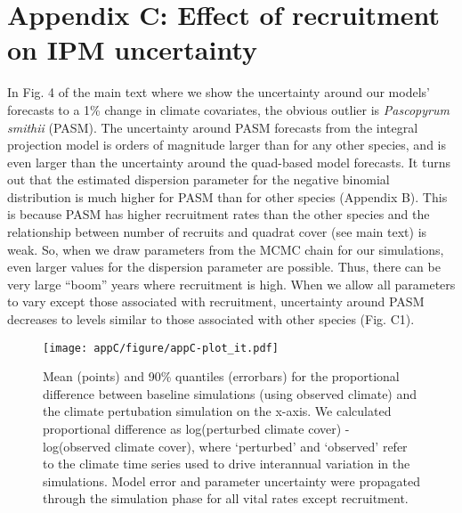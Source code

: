 \documentclass[12pt,]{article}
\author{}
\date{}
\begin{document}
\normalsize


\renewcommand\thefigure{C\arabic{figure}} 



\section{Appendix C: Effect of recruitment on IPM
uncertainty}\label{appendix-c-effect-of-recruitment-on-ipm-uncertainty}

In Fig. 4 of the main text where we show the uncertainty around our
models' forecasts to a 1\% change in climate covariates, the obvious
outlier is \emph{Pascopyrum smithii} (PASM). The uncertainty around PASM
forecasts from the integral projection model is orders of magnitude
larger than for any other species, and is even larger than the
uncertainty around the quad-based model forecasts. It turns out that the
estimated dispersion parameter for the negative binomial distribution is
much higher for PASM than for other species (Appendix B). This is
because PASM has higher recruitment rates than the other species and the
relationship between number of recruits and quadrat cover (see main
text) is weak. So, when we draw parameters from the MCMC chain for our
simulations, even larger values for the dispersion parameter are
possible. Thus, there can be very large ``boom'' years where recruitment
is high. When we allow all parameters to vary except those associated
with recruitment, uncertainty around PASM decreases to levels similar to
those associated with other species (Fig. C1).

\begin{figure}[htbp]
\centering
\texttt{[image: appC/figure/appC-plot\_it.pdf]}
\caption{Mean (points) and 90\% quantiles (errorbars) for the
proportional difference between baseline simulations (using observed
climate) and the climate pertubation simulation on the x-axis. We
calculated proportional difference as log(perturbed climate cover) -
log(observed climate cover), where `perturbed' and `observed' refer to
the climate time series used to drive interannual variation in the
simulations. Model error and parameter uncertainty were propagated
through the simulation phase for all vital rates except recruitment.}
\end{figure}
\end{document}
